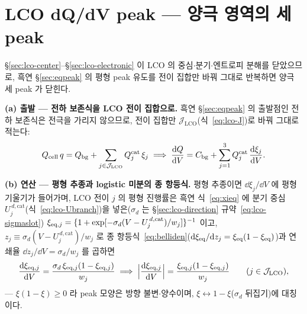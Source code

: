 \section{LCO dQ/dV peak --- 양극 영역의 세 peak}\label{sec:lco-peak}
\S\ref{sec:lco-center}--\S\ref{sec:lco-electronic} 이 LCO 의 중심$\cdot$분기$\cdot$엔트로피 분해를 닫았으므로,
흑연 \S\ref{sec:eqpeak} 의 평형 peak 유도를 전이 집합만 바꿔 그대로 반복하면 양극 세 peak 가 닫힌다.

\textbf{(a) 출발 --- 전하 보존식을 LCO 전이 집합으로.} 흑연 \S\ref{sec:eqpeak} 의 출발점인 전하 보존식은
전극을 가리지 않으므로, 전이 집합만 $\mathcal J_\mathrm{LCO}$(식~\eqref{eq:lco-J})로 바꿔 그대로 적는다:
\begin{equation}
Q_{\mathrm{cell}}\,q=Q_{\mathrm{bg}}+\sum_{j\in\mathcal J_\mathrm{LCO}}Q_j^\mathrm{cat}\,\xi_j
\;\Longrightarrow\;
\frac{\mathrm{d} Q}{\mathrm{d} V}=C_{\mathrm{bg}}+\sum_{j=1}^{3}Q_j^\mathrm{cat}\,\frac{\mathrm{d}\xi_j}{\mathrm{d} V}.
\label{eq:lco-charge}
\end{equation}

\textbf{(b) 연산 --- 평형 추종과 logistic 미분의 종 항등식.} 평형 추종이면 $\dd\xi_j/\dd V$ 에 평형 기울기가 들어가며, LCO 전이 $j$ 의 평형 진행률은 흑연 식~\eqref{eq:xieq}
에 분기 중심 $U_j^{\,d,\mathrm{cat}}$(식~\eqref{eq:lco-Ubranch})을 넣은($\sigma_d$ 는 \S\ref{sec:lco-direction} 규약~\eqref{eq:lco-sigmaslot})
$\xi_{\mathrm{eq},j}=\{1+\exp[-\sigma_d(V-U_j^{\,d,\mathrm{cat}})/w_j]\}^{-1}$ 이고, $z_j\equiv\sigma_d(V-U_j^{\,d,
\mathrm{cat}})/w_j$ 로 종 항등식~\eqref{eq:belliden}($\mathrm{d}\xi_{\mathrm{eq}}/\mathrm{d} z_j=\xi_{\mathrm{eq}}(1-\xi_{\mathrm{eq}})$)과 연쇄율
$\dd z_j/\dd V=\sigma_d/w_j$ 를 곱하면
\begin{equation}
\frac{\mathrm{d}\xi_{\mathrm{eq},j}}{\mathrm{d} V}=\frac{\sigma_d\,\xi_{\mathrm{eq},j}(1-\xi_{\mathrm{eq},j})}{w_j}
\;\Longrightarrow\;
\Big|\frac{\mathrm{d}\xi_{\mathrm{eq},j}}{\mathrm{d} V}\Big|=\frac{\xi_{\mathrm{eq},j}(1-\xi_{\mathrm{eq},j})}{w_j}
\qquad(j\in\mathcal J_\mathrm{LCO}),
\label{eq:lco-belliden}
\end{equation}
--- $\xi(1-\xi)\ge0$ 라 peak 모양은 방향 불변$\cdot$양수이며, $\xi\leftrightarrow1-\xi$($\sigma_d$ 뒤집기)에
대칭이다.

